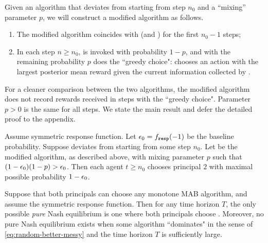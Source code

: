 Given an algorithm \alg[1] that deviates from \DynGreedy starting from
step $n_0$ and a ``mixing'' parameter $p$, we will construct a
modified algorithm as follows.
\begin{enumerate}
\item The modified algorithm coincides with \alg[1] (and \DynGreedy)
for the first $n_0-1$ steps;
\item In each step $n\geq n_0$, \alg[1] is invoked with probability
  $1-p$, and with the remaining probability $p$ does the ``greedy
  choice": chooses an action with the largest posterior mean reward
  given the current information collected by \alg[1].
\end{enumerate}
For a cleaner comparison between the two algorithms, the modified algorithm does not record rewards received in steps with the ``greedy choice". Parameter $p>0$ is the same for all steps. We state the main result and defer the detailed proof to the appendix.

\begin{theorem}\label{thm:random-greedy}
Assume symmetric \HardMaxRandom response function. Let $\epsilon_0 = f_{\mathtt{resp}}(-1)$ be the baseline probability. Suppose \alg[1] deviates from \DynGreedy starting from some step $n_0$. Let \alg[2] be the modified algorithm, as described above, with mixing parameter $p$ such that
    $(1-\epsilon_0)(1-p)>\epsilon_0$.
Then each agent $t\geq n_0$ chooses principal $2$ with maximal possible probability $1-\epsilon_0$.
\end{theorem}

\begin{corollary}\label{cor:random-greedy}
  Suppose that both principals can choose any monotone MAB algorithm, and assume the symmetric \HardMaxRandom response
  function. Then for any time
  horizon $T$, the only possible \emph{pure} Nash equilibrium is one
  where both principals choose \DynGreedy. Moreover, no pure Nash
  equilibrium exists when some algorithm ``dominates" \DynGreedy in
  the sense of \eqref{eq:random-better-messy} and the time horizon $T$
  is sufficiently large.
\end{corollary}


